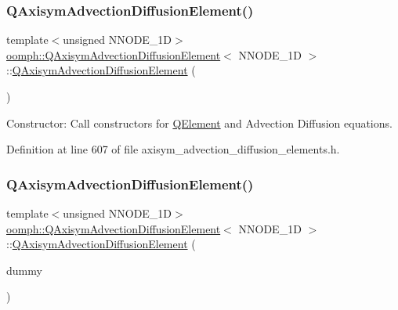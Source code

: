 \subsubsection{\texorpdfstring{Q\+Axisym\+Advection\+Diffusion\+Element()}{QAxisymAdvectionDiffusionElement()}\hspace{0.1cm}{\footnotesize\ttfamily [1/2]}}
{\footnotesize\ttfamily template$<$unsigned N\+N\+O\+D\+E\+\_\+1D$>$ \\
\hyperlink{classoomph_1_1QAxisymAdvectionDiffusionElement}{oomph\+::\+Q\+Axisym\+Advection\+Diffusion\+Element}$<$ N\+N\+O\+D\+E\+\_\+1D $>$\+::\hyperlink{classoomph_1_1QAxisymAdvectionDiffusionElement}{Q\+Axisym\+Advection\+Diffusion\+Element} (\begin{DoxyParamCaption}{ }\end{DoxyParamCaption})\hspace{0.3cm}{\ttfamily [inline]}}



Constructor\+: Call constructors for \hyperlink{classoomph_1_1QElement}{Q\+Element} and Advection Diffusion equations. 



Definition at line 607 of file axisym\+\_\+advection\+\_\+diffusion\+\_\+elements.\+h.

\mbox{\label{classoomph_1_1QAxisymAdvectionDiffusionElement_ae4e969a1020ebfd6922029a63a14a08e}} 
\subsubsection{\texorpdfstring{Q\+Axisym\+Advection\+Diffusion\+Element()}{QAxisymAdvectionDiffusionElement()}\hspace{0.1cm}{\footnotesize\ttfamily [2/2]}}
{\footnotesize\ttfamily template$<$unsigned N\+N\+O\+D\+E\+\_\+1D$>$ \\
\hyperlink{classoomph_1_1QAxisymAdvectionDiffusionElement}{oomph\+::\+Q\+Axisym\+Advection\+Diffusion\+Element}$<$ N\+N\+O\+D\+E\+\_\+1D $>$\+::\hyperlink{classoomph_1_1QAxisymAdvectionDiffusionElement}{Q\+Axisym\+Advection\+Diffusion\+Element} (\begin{DoxyParamCaption}\item[{const \hyperlink{classoomph_1_1QAxisymAdvectionDiffusionElement}{Q\+Axisym\+Advection\+Diffusion\+Element}$<$ N\+N\+O\+D\+E\+\_\+1D $>$ \&}]{dummy }\end{DoxyParamCaption})\hspace{0.3cm}{\ttfamily [inline]}}



